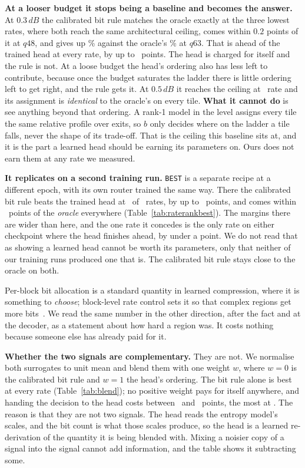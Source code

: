 \documentclass[10pt,twocolumn,letterpaper]{article}
\newcommand{\dB}{\,dB}
\begin{document}
\textbf{At a looser budget it stops being a baseline and becomes the answer.}
At $0.3\dB$ the calibrated bit rule matches the oracle exactly at the three lowest
rates, where both reach the same architectural ceiling, comes within $0.2$
points of it at $q48$, and gives up \RateRankLoose\% against the oracle's
\SigLooseHigh\% at $q63$. That is ahead of the trained head at every rate, by up to
\RateRankLooseAheadBy\ points. The head is charged for itself and the rule
is not. At a loose budget the head's ordering also has less left to contribute,
because once the budget saturates the ladder there is little ordering left to
get right, and the rule gets it. At $0.5\dB$ it reaches the ceiling at
\RateRankHalfDbExact\ rate and its assignment is \emph{identical} to the
oracle's on every tile. \textbf{What it cannot do} is see
anything beyond that ordering. A rank-1 model in the level assigns every tile the
same relative profile over exits, so $b$ only decides where on the ladder a tile
falls, never the shape of its trade-off. That is the ceiling this baseline sits
at, and it is the part a learned head should be earning its parameters on. Ours
does not earn them at any rate we measured.

\textbf{It replicates on a second training run.}
\texttt{BEST} is a separate recipe at a different epoch, with its own router
trained the same way. There the calibrated bit rule beats the trained head at
\BestRankWinsN\ of \BestRankOfN\ rates, by up to \BestRankBy\ points, and comes
within \BestRankToOracle\ points of the \emph{oracle} everywhere
(Table~\ref{tab:raterankbest}). The margins there are wider than here, and the
one rate it concedes is the only rate on either checkpoint where the head
finishes ahead, by under a point. We do not read that as showing a learned head
cannot be worth its parameters, only that neither of our training runs produced
one that is. The calibrated bit rule stays close to the oracle on both.

Per-block bit allocation is a standard quantity in learned compression, where it
is something to \emph{choose}; block-level rate control sets it so that complex
regions get more bits~\cite{blockratecontrol}. We read the same number in the
other direction, after the fact and at the decoder, as a statement about how hard
a region was. It costs nothing because someone else has already paid for it.

\textbf{Whether the two signals are complementary.} They are not. We normalise both surrogates
to unit mean and blend them with one weight $w$, where $w{=}0$ is the
calibrated bit rule and $w{=}1$ the head's ordering. The bit rule alone is best
at every rate (Table~\ref{tab:blend}); no positive weight pays for itself
anywhere, and handing the decision to the head costs between \BlendCostMin\ and
\BlendCostMax\ points, the most at \BlendCostMaxQ. The reason is that they are
not two signals. The head reads the entropy model's scales, and the bit count is
what those scales produce, so the head is a learned re-derivation of the
quantity it is being blended with. Mixing a noisier copy of a signal into the
signal cannot add information, and the table shows it subtracting some.
\end{document}
